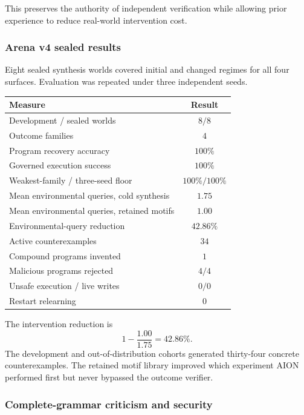 This preserves the authority of independent verification while allowing prior
experience to reduce real-world intervention cost.


\subsubsection{Arena v4 sealed results}

Eight sealed synthesis worlds covered initial and changed regimes for all four
surfaces.  Evaluation was repeated under three independent seeds.

\begin{center}
\small
\begin{tabular}{|p{6.6cm}|c|}
\hline
\textbf{Measure} & \textbf{Result} \\
\hline
Development / sealed worlds & $8/8$ \\
Outcome families & $4$ \\
Program recovery accuracy & $100\%$ \\
Governed execution success & $100\%$ \\
Weakest-family / three-seed floor & $100\%/100\%$ \\
Mean environmental queries, cold synthesis & $1.75$ \\
Mean environmental queries, retained motifs & $1.00$ \\
Environmental-query reduction & $42.86\%$ \\
Active counterexamples & $34$ \\
Compound programs invented & $1$ \\
Malicious programs rejected & $4/4$ \\
Unsafe execution / live writes & $0/0$ \\
Restart relearning & $0$ \\
\hline
\end{tabular}
\end{center}

The intervention reduction is
\begin{equation}
1-\frac{1.00}{1.75}=42.86\%.
\label{eq:arena-v4-query-reduction}
\end{equation}
The development and out-of-distribution cohorts generated thirty-four concrete
counterexamples.  The retained motif library improved which experiment AION
performed first but never bypassed the outcome verifier.


\subsubsection{Complete-grammar criticism and security}

